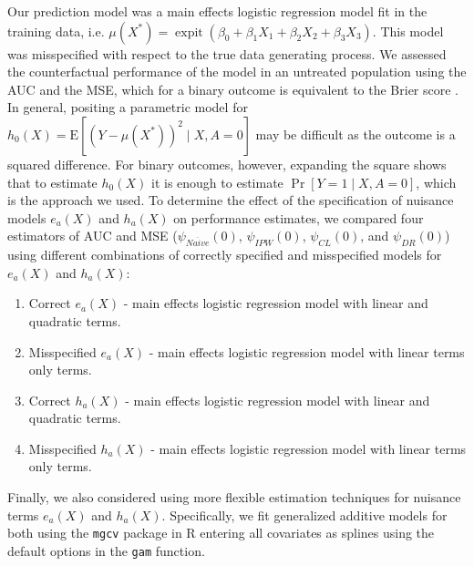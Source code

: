 Our prediction model was a main effects logistic regression model fit in the training data, i.e. $\mu\left(X^*\right) = \operatorname{expit}(\beta_0 + \beta_1 X_1 + \beta_2 X_2 + \beta_3 X_3)$. This model was misspecified with respect to the true data generating process. We assessed the counterfactual performance of the model in an untreated population using the AUC and the MSE, which for a binary outcome is equivalent to the Brier score \cite{brier_verification_1950}. In general, positing a parametric model for $h_0(X)=\mathrm{E}[(Y-\mu\left(X^*\right))^2 \mid X, A=0]$ may be difficult as the outcome is a squared difference. For binary outcomes, however, expanding the square shows that to estimate $h_0(X)$ it is enough to estimate $\operatorname{Pr}[Y=1 \mid X, A=0]$, which is the approach we used. To determine the effect of the specification of nuisance models $e_a(X)$ and $h_a(X)$ on performance estimates, we compared four estimators of AUC and MSE (${\psi}_{Na\ddot{i}ve}(0)$, ${\psi}_{IPW}(0)$, ${\psi}_{CL}(0)$, and ${\psi}_{DR}(0)$) using different combinations of correctly specified and misspecified models for $e_a(X)$ and $h_a(X)$:
\begin{enumerate}
    \item Correct $e_a(X)$ - main effects logistic regression model with linear and quadratic terms.
    \item Misspecified $e_a(X)$ - main effects logistic regression model with linear terms only terms.
    \item Correct $h_a(X)$ - main effects logistic regression model with linear and quadratic terms.
    \item Misspecified $h_a(X)$ - main effects logistic regression model with linear terms only terms.
\end{enumerate}
Finally, we also considered using more flexible estimation techniques for nuisance terms $e_a(X)$ and $h_a(X)$. Specifically, we fit generalized additive models for both using the \texttt{mgcv} package in $\mathrm{R}$ entering all covariates as splines using the default options in the \texttt{gam} function.

